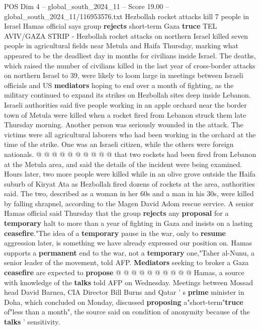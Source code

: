 \begin{textsample}{POS Dim 4 – global\_south\_2024\_11 – Score 19.00 – global\_south\_2024\_11/116953576.txt}  \label{ex:f4_pos_282}
Hezbollah rocket attacks kill 7 people in Israel Hamas official says group \textbf{rejects} short-term Gaza \textbf{truce} TEL AVIV/GAZA STRIP - Hezbollah rocket attacks on northern Israel killed seven people in agricultural fields near Metula and Haifa Thursday, marking what appeared to be the deadliest day in months for civilians inside Israel.
The deaths, which raised the number of civilians killed in the last year of cross-border attacks on northern Israel to 39, were likely to loom large in meetings between Israeli officials and US \textbf{mediators} hoping to end over a month of fighting, as the military continued to expand its strikes on Hezbollah sites deep inside Lebanon.
Israeli authorities said five people working in an apple orchard near the border town of Metula were killed when a rocket fired from Lebanon struck them late Thursday morning.
Another person was seriously wounded in the attack.
The victims were all agricultural laborers who had been working in the orchard at the time of the strike.
One was an Israeli citizen, while the others were foreign nationals. @ @ @ @ @ @ @ @ @ @ that two rockets had been fired from Lebanon at the Metula area, and said the details of the incident were being examined.
Hours later, two more people were killed while in an olive grove outside the Haifa suburb of Kiryat Ata as Hezbollah fired dozens of rockets at the area, authorities said.
The two, described as a woman in her 60s and a man in his 30s, were killed by falling shrapnel, according to the Magen David Adom rescue service.
A senior Hamas official said Thursday that the group \textbf{rejects} any \textbf{proposal} for a \textbf{temporary} halt to more than a year of fighting in Gaza and insists on a lasting \textbf{ceasefire}."The idea of a \textbf{temporary} pause in the war, only to \textbf{resume} aggression later, is something we have already expressed our position on.
Hamas supports a \textbf{permanent} end to the war, not a \textbf{temporary} one,"Taher al-Nunu, a senior leader of the movement, told AFP. \textbf{Mediators} seeking to broker a Gaza \textbf{ceasefire} are expected to \textbf{propose} @ @ @ @ @ @ @ @ @ @ Hamas, a source with knowledge of the \textbf{talks} told AFP on Wednesday.
Meetings between Mossad head David Barnea, CIA Director Bill Burns and Qatar ' s \textbf{prime} minister in Doha, which concluded on Monday, discussed \textbf{proposing} a"short-term"\textbf{truce} of"less than a month", the source said on condition of anonymity because of the \textbf{talks} ' sensitivity.

\end{textsample}
